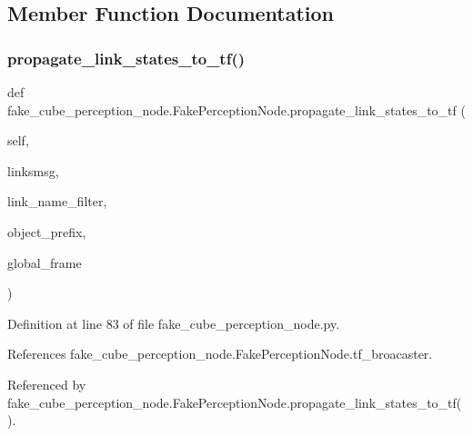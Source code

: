 \subsection{Member Function Documentation}
\mbox{\label{classfake__cube__perception__node_1_1FakePerceptionNode_aeac788f768e625ecbe445c6af105d3f8}} 
\subsubsection{\texorpdfstring{propagate\+\_\+link\+\_\+states\+\_\+to\+\_\+tf()}{propagate\_link\_states\_to\_tf()}\hspace{0.1cm}{\footnotesize\ttfamily [1/3]}}
{\footnotesize\ttfamily def fake\+\_\+cube\+\_\+perception\+\_\+node.\+Fake\+Perception\+Node.\+propagate\+\_\+link\+\_\+states\+\_\+to\+\_\+tf (\begin{DoxyParamCaption}\item[{}]{self,  }\item[{}]{linksmsg,  }\item[{}]{link\+\_\+name\+\_\+filter,  }\item[{}]{object\+\_\+prefix,  }\item[{}]{global\+\_\+frame }\end{DoxyParamCaption})}



Definition at line 83 of file fake\+\_\+cube\+\_\+perception\+\_\+node.\+py.



References fake\+\_\+cube\+\_\+perception\+\_\+node.\+Fake\+Perception\+Node.\+tf\+\_\+broacaster.



Referenced by fake\+\_\+cube\+\_\+perception\+\_\+node.\+Fake\+Perception\+Node.\+propagate\+\_\+link\+\_\+states\+\_\+to\+\_\+tf().


